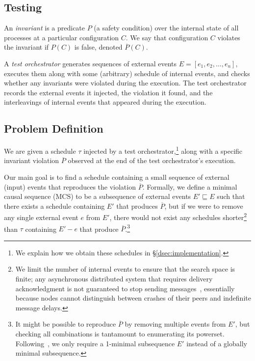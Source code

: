 \subsection{Testing}

An {\em invariant} is a predicate $P$ (a safety
condition) over the internal state of all processes at a particular
configuration $C$. We say that configuration
$C$ violates the invariant if $P\left(C\right)$ is false, denoted $\overline{P}\left(C\right)$.

A {\em test orchestrator} generates sequences of external events
$E = [ e_1, e_2, \ldots, e_n ]$, executes them along with some
(arbitrary) schedule of internal
events, and checks whether any invariants were violated during the execution.
The test orchestrator records the external events it injected, the
violation it found, and the
interleavings of internal events that appeared during the execution.

\subsection{Problem Definition}

We are given a schedule $\tau$ injected by a test orchestrator,\footnote{We
explain how we obtain these schedules in \S\ref{dsec:implementation}.} along
with a specific invariant violation $\overline{P}$ observed at the end of the
test orchestrator's execution.

Our main goal is to find a schedule containing a small sequence of
external (input) events that reproduces the violation $\overline{P}$.
Formally, we define a minimal causal sequence (MCS)
to be a subsequence of external events $E' \sqsubseteq E$ such that there exists
a schedule containing $E'$ that produces
$\overline{P}$, but if we were to remove any
single external event $e$ from $E'$, there would not exist any schedules
shorter\footnote{We limit the number of internal events to ensure
that the search space is finite; any asynchronous
distributed system that requires
delivery acknowledgment is not guaranteed
to stop sending messages~\cite{aguilera1997heartbeat}, essentially because nodes cannot distinguish
between crashes of their peers and indefinite message delays.} than $\tau$
containing $E' - e$ that produce
$\overline{P}$.\footnote{It might be possible to reproduce $\overline{P}$ by
removing multiple events from $E'$,
but checking all combinations is tantamount to enumerating its powerset.
Following~\cite{Zeller:2002:SIF:506201.506206}, we
only require a 1-minimal subsequence $E'$ instead of a globally minimal
subsequence.}

